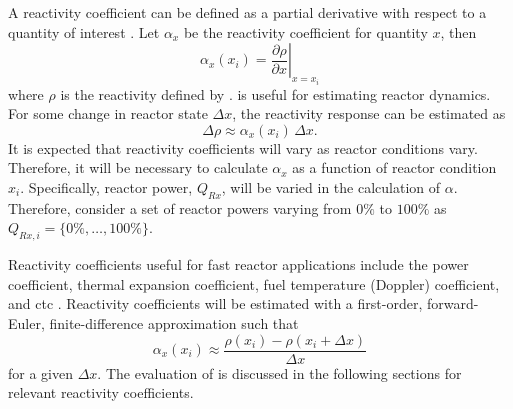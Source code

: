   A reactivity coefficient can be defined as a partial derivative with respect
  to a quantity of interest \cite{textbookknief}. Let $\alpha_x$ be the 
  reactivity coefficient for quantity $x$, then
  \begin{equation}
    \label{eq:reactivity_coefficient}
    \alpha_x(x_i) = \left. \frac{\partial \rho}{\partial x} \right|_{x=x_i}
  \end{equation}
  where $\rho$ is the reactivity defined by .
   is useful for estimating reactor dynamics.
  For some change in reactor state $\Delta x$, the reactivity response can be
  estimated as 
  \begin{equation}
    \label{eq:reactivity_estimate}
    \Delta \rho \approx \alpha_x(x_i) \, \Delta x.
  \end{equation}
  It is expected that reactivity coefficients will vary as reactor conditions
  vary. Therefore, it will be necessary to calculate $\alpha_x$ as a function of
  reactor condition $x_i$. Specifically, reactor power, $Q_{Rx}$, will be varied 
  in the calculation of $\alpha$. Therefore, consider a set of reactor powers
  varying from $0\%$ to $100\%$ as $Q_{Rx,i} = \{0\%,\ldots,100\%\}$.

  Reactivity coefficients useful for fast reactor applications include the power
  coefficient, thermal expansion coefficient, fuel temperature (Doppler)
  coefficient, and \gls{ctc} \cite{textbookknief}.  Reactivity coefficients will
  be estimated with a first-order, forward-Euler, finite-difference
  approximation such that
  \begin{equation}
    \label{eq:reactivity_coefficient_finite_difference}
    \alpha_x(x_i) \approx \frac{\rho(x_i) - \rho(x_i + \Delta x)}{\Delta x}
  \end{equation}
  for a given $\Delta x$. The evaluation of
   is discussed in the
  following sections for relevant reactivity coefficients.

